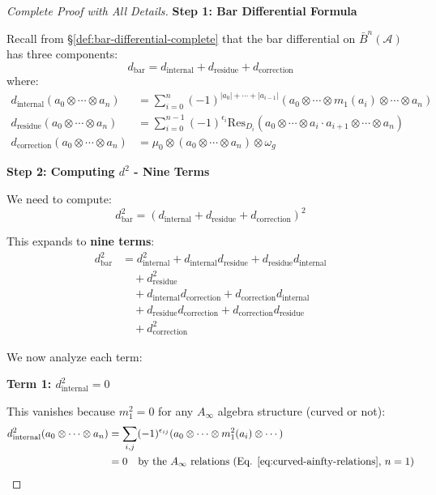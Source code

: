 \begin{proof}[Complete Proof with All Details]

\textbf{Step 1: Bar Differential Formula}

Recall from \S\ref{def:bar-differential-complete} that the bar differential on 
$\bar{B}^n(\mathcal{A})$ has three components:
\begin{equation}
d_{\text{bar}} = d_{\text{internal}} + d_{\text{residue}} + d_{\text{correction}}
\end{equation}
where:
\begin{align}
d_{\text{internal}}(a_0 \otimes \cdots \otimes a_n) 
&= \sum_{i=0}^n (-1)^{|a_0| + \cdots + |a_{i-1}|} (a_0 \otimes \cdots \otimes m_1(a_i) 
\otimes \cdots \otimes a_n) \\
d_{\text{residue}}(a_0 \otimes \cdots \otimes a_n) 
&= \sum_{i=0}^{n-1} (-1)^{\epsilon_i} \text{Res}_{D_i}(a_0 \otimes \cdots \otimes a_i \cdot a_{i+1} 
\otimes \cdots \otimes a_n) \\
d_{\text{correction}}(a_0 \otimes \cdots \otimes a_n) 
&= \mu_0 \otimes (a_0 \otimes \cdots \otimes a_n) \otimes \omega_g
\end{align}

\textbf{Step 2: Computing $d^2$ - Nine Terms}

We need to compute:
\begin{equation}
d_{\text{bar}}^2 = (d_{\text{internal}} + d_{\text{residue}} + d_{\text{correction}})^2
\end{equation}

This expands to \textbf{nine terms}:
\begin{align}
d_{\text{bar}}^2 &= d_{\text{internal}}^2 
+ d_{\text{internal}} d_{\text{residue}} + d_{\text{residue}} d_{\text{internal}} \\
&\quad + d_{\text{residue}}^2 \\
&\quad + d_{\text{internal}} d_{\text{correction}} + d_{\text{correction}} d_{\text{internal}} \\
&\quad + d_{\text{residue}} d_{\text{correction}} + d_{\text{correction}} d_{\text{residue}} \\
&\quad + d_{\text{correction}}^2
\end{align}

We now analyze each term:

\textbf{Term 1: $d_{\text{internal}}^2 = 0$}

This vanishes because $m_1^2 = 0$ for any $A_\infty$ algebra structure (curved or not):
\begin{align}
d_{\text{internal}}^2(a_0 \otimes \cdots \otimes a_n) 
&= \sum_{i,j} (-1)^{\epsilon_{ij}} (a_0 \otimes \cdots \otimes m_1^2(a_i) \otimes \cdots) \\
&= 0 \quad \text{by the $A_\infty$ relations (Eq. \ref{eq:curved-ainfty-relations}, $n=1$)}
\end{align}


\end{proof}
